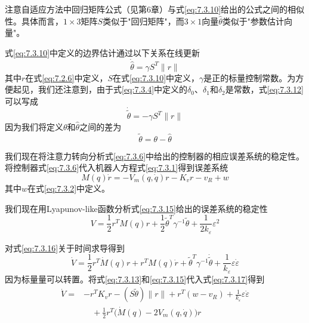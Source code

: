 \documentclass[UTF8]{ctexart}
\begin{document}
注意自适应方法中回归矩阵公式（见第6章）与式\eqref{eq:7.3.10}给出的公式之间的相似性。具体而言，$1 \times 3$矩阵$S$类似于"回归矩阵"，而$3 \times 1$向量$\hat{\theta}$类似于"参数估计向量"。

式\eqref{eq:7.3.10}中定义的边界估计通过以下关系在线更新
\begin{equation}\label{eq:7.3.12}
\dot{\hat{\theta}} = \gamma S^T\|r\|
\end{equation}
其中$r$在式\eqref{eq:7.2.6}中定义，$S$在式\eqref{eq:7.3.10}中定义，$\gamma$是正的标量控制常数。为方便起见，我们还注意到，由于式\eqref{eq:7.3.4}中定义的$\delta_0$、$\delta_1$和$\delta_2$是常数，式\eqref{eq:7.3.12}可以写成
\begin{equation}\label{eq:7.3.13}
\dot{\tilde{\theta}} = -\gamma S^T\|r\|
\end{equation}
因为我们将定义$\theta$和$\hat{\theta}$之间的差为
\begin{equation}\label{eq:7.3.14}
\tilde{\theta} = \theta - \hat{\theta}
\end{equation}

我们现在将注意力转向分析式\eqref{eq:7.3.6}中给出的控制器的相应误差系统的稳定性。将控制器式\eqref{eq:7.3.6}代入机器人方程式\eqref{eq:7.3.1}得到误差系统
\begin{equation}\label{eq:7.3.15}
M(q)\dot{r} = -V_m(q,\dot{q})r - K_v r - v_R + w
\end{equation}
其中$w$在式\eqref{eq:7.3.2}中定义。

我们现在用Lyapunov-like函数分析式\eqref{eq:7.3.15}给出的误差系统的稳定性
\begin{equation}\label{eq:7.3.16}
V = \frac{1}{2}r^T M(q)r + \frac{1}{2}\tilde{\theta}^T \gamma^{-1}\tilde{\theta} + \frac{1}{2k_\varepsilon}\varepsilon^2
\end{equation}

对式\eqref{eq:7.3.16}关于时间求导得到
\begin{equation}\label{eq:7.3.17}
\dot{V} = \frac{1}{2}r^T\dot{M}(q)r + r^T M(q)\dot{r} + \tilde{\theta}^T\gamma^{-1}\dot{\tilde{\theta}} + \frac{1}{k_\varepsilon}\varepsilon\dot{\varepsilon}
\end{equation}
因为标量量可以转置。将式\eqref{eq:7.3.13}和\eqref{eq:7.3.15}代入式\eqref{eq:7.3.17}得到
\begin{equation}\label{eq:7.3.18}
\begin{aligned}
\dot{V} = {} & -r^T K_v r - (S\tilde{\theta})\|r\| + r^T(w - v_R) + \frac{1}{k_\varepsilon}\varepsilon\dot{\varepsilon} \\
& \quad {} + \frac{1}{2} r^T \bigl( \dot{M}(q) - 2V_m(q,\dot{q}) \bigr) r
\end{aligned}
\end{equation}
\end{document}
